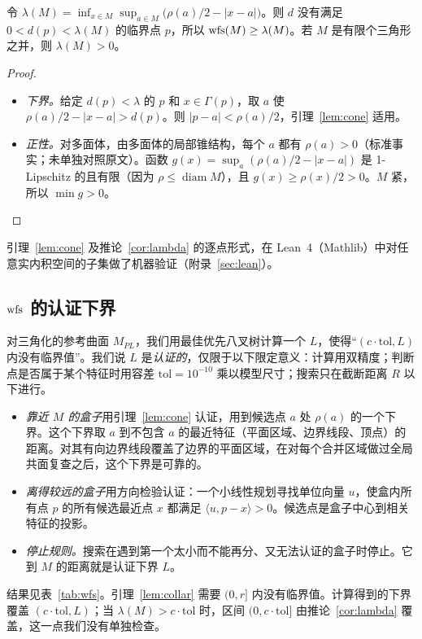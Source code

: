 \begin{corollary}\label{cor:lambda}
令 $\lambda(M)=\inf_{x\in M}\sup_{a\in M}\bigl(\rho(a)/2-|x-a|\bigr)$。则 $d$ 没有满足 $0<d(p)<\lambda(M)$ 的临界点 $p$，所以 $\operatorname{wfs}(M)\ge\lambda(M)$。若 $M$ 是有限个三角形之并，则 $\lambda(M)>0$。
\end{corollary}
\begin{proof}
\begin{itemize}
\item \emph{下界。}给定 $d(p)<\lambda$ 的 $p$ 和 $x\in\Gamma(p)$，取 $a$ 使 $\rho(a)/2-|x-a|>d(p)$。则 $|p-a|<\rho(a)/2$，引理~\ref{lem:cone} 适用。
\item \emph{正性。}对多面体，由多面体的局部锥结构，每个 $a$ 都有 $\rho(a)>0$（标准事实；未单独对照原文）。函数 $g(x)=\sup_a(\rho(a)/2-|x-a|)$ 是 1-Lipschitz 的且有限（因为 $\rho\le\operatorname{diam}M$），且 $g(x)\ge\rho(x)/2>0$。$M$ 紧，所以 $\min g>0$。
\end{itemize}
\end{proof}

引理~\ref{lem:cone} 及推论~\ref{cor:lambda} 的逐点形式，在 Lean~4（Mathlib）中对任意实内积空间的子集做了机器验证（附录~\ref{sec:lean}）。

\subsection{$\operatorname{wfs}$ 的认证下界}
对三角化的参考曲面 $M_{PL}$，我们用最佳优先八叉树计算一个 $L$，使得``$(c\cdot\mathrm{tol},L)$ 内没有临界值''。我们说 $L$ 是\emph{认证的}，仅限于以下限定意义：计算用双精度；判断点是否属于某个特征时用容差 $\mathrm{tol}=10^{-10}$ 乘以模型尺寸；搜索只在截断距离 $R$ 以下进行。
\begin{itemize}
\item \emph{靠近 $M$ 的盒子}用引理~\ref{lem:cone} 认证，用到候选点 $a$ 处 $\rho(a)$ 的一个下界。这个下界取 $a$ 到不包含 $a$ 的最近特征（平面区域、边界线段、顶点）的距离。对其有向边界线段覆盖了边界的平面区域，在对每个合并区域做过全局共面复查之后，这个下界是可靠的。
\item \emph{离得较远的盒子}用方向检验认证：一个小线性规划寻找单位向量 $u$，使盒内所有点 $p$ 的所有候选最近点 $x$ 都满足 $\langle u,p-x\rangle>0$。候选点是盒子中心到相关特征的投影。
\item \emph{停止规则。}搜索在遇到第一个太小而不能再分、又无法认证的盒子时停止。它到 $M$ 的距离就是认证下界 $L$。
\end{itemize}
结果见表~\ref{tab:wfs}。引理~\ref{lem:collar} 需要 $(0,r]$ 内没有临界值。计算得到的下界覆盖 $(c\cdot\mathrm{tol},L)$；当 $\lambda(M)>c\cdot\mathrm{tol}$ 时，区间 $(0,c\cdot\mathrm{tol}]$ 由推论~\ref{cor:lambda} 覆盖，这一点我们没有单独检查。

